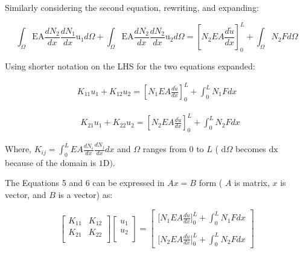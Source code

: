\documentclass[10pt]{article}
\begin{document}
Similarly considering the second equation, rewriting, and expanding:

$$
\int_{\Omega} \mathrm{EA} \frac{d N_{2}}{d x} \frac{d N_{1}}{d x} \mathrm{u}_{1} d \Omega+\int_{\Omega} \mathrm{EA} \frac{d N_{2}}{d x} \frac{d N_{2}}{d x} \mathrm{u}_{2} d \Omega=\left[N_{2} E A \frac{d \widetilde{u}}{d x}\right]_{0}^{L}+\int_{\Omega} N_{2} F d \Omega
$$

Using shorter notation on the LHS for the two equations expanded:

\begin{equation}
\begin{aligned}
 K_{11} u_{1}+K_{12} u_{2}=\left[N_{1} E A \frac{d \widetilde{u}}{d x}\right]_{0}^{L}+\int_{0}^{L} N_{1} F d x 
\end{aligned}
\end{equation}

\begin{equation}
\begin{aligned}
& K_{21} u_{1}+K_{22} u_{2}=\left[N_{2} E A \frac{d \widetilde{u}}{d x}\right]_{0}^{L}+\int_{0}^{L} N_{2} F d x
\end{aligned}
\end{equation}



Where, $K_{i j}=\int_{0}^{L} E A \frac{d N_{i}}{d x} \frac{d N_{j}}{d x} d x$ and $\Omega$ ranges from 0 to $L$ ( $\mathrm{d} \Omega$ becomes $\mathrm{dx}$ because of the domain is $1 \mathrm{D})$.

The Equations 5 and 6 can be expressed in $A x=B$ form ( $A$ is matrix, $x$ is vector, and $B$ is a vector) as:

\[
\left [
    \begin{matrix}
       K_{11} & K_{12} \\
       K_{21} & K_{22} \\
    \end{matrix}
    \right ]  \left [
    \begin{matrix}
       u_1\\
       u_2\\
    \end{matrix}
    \right ] =\left [
    \begin{matrix}
       \bigl[N_{1} E A \frac{d \widetilde{u}}{d x}\bigr]_{0}^{L}+\int_{0}^{L} N_{1} F d x \\
       \\
       \bigl[N_{2} E A \frac{d \widetilde{u}}{d x}\bigr]_{0}^{L}+\int_{0}^{L} N_{2} F d x
    \end{matrix}
    \right ] 
\]
\end{document}
